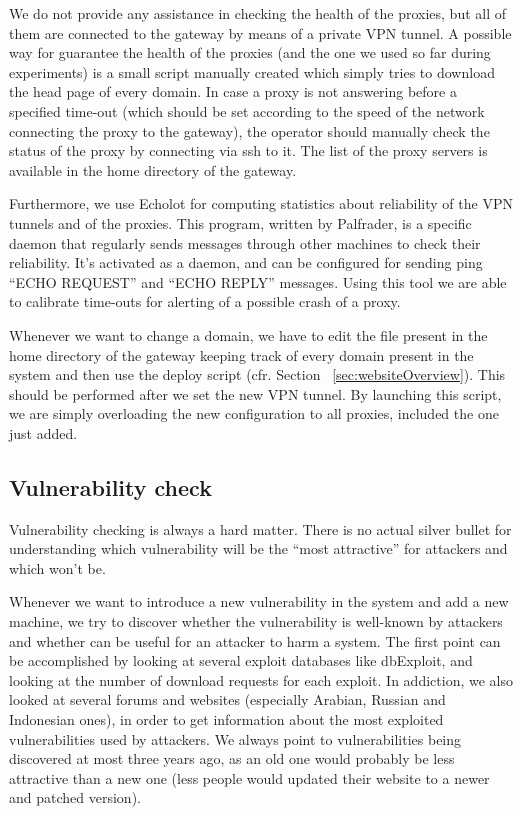 We do not provide any assistance in checking the health of the proxies, but all of them are connected to the gateway by means of a private VPN tunnel. A possible way for guarantee the health of the proxies (and the one we used so far during experiments) is a small script manually created which simply tries to download the head page of every domain. In case a proxy is not answering before a specified time-out (which should be set according to the speed of the network connecting the proxy to the gateway), the operator should manually check the status of the proxy by connecting via ssh to it. The list of the proxy servers is available in the home directory of the gateway.

Furthermore, we use Echolot \cite{echolot} for computing statistics about reliability of the VPN tunnels and of the proxies. This program, written by Palfrader, is a specific daemon that regularly sends messages through other machines to check their reliability. It's activated as a daemon, and can be configured for sending ping ``ECHO REQUEST'' and ``ECHO REPLY'' messages. Using this tool we are able to calibrate time-outs for alerting of a possible crash of a proxy.

Whenever we want to change a domain, we have to edit the file present in the home directory of the gateway keeping track of every domain present in the system and then use the deploy script (cfr. Section ~\ref{sec:websiteOverview}). This should be performed after we set the new VPN tunnel. By launching this script, we are simply overloading the new configuration to all proxies, included the one just added.

\subsection{Vulnerability check}

Vulnerability checking is always a hard matter. There is no actual silver bullet for understanding which vulnerability will be the ``most attractive'' for attackers and which won't be.

Whenever we want to introduce a new vulnerability in the system and add a new machine, we try to discover whether the vulnerability is well-known by attackers and whether can be useful for an attacker to harm a system.
The first point can be accomplished by looking at several exploit databases like dbExploit, and looking at the number of download requests for each exploit. In addiction, we also looked at several forums and websites (especially Arabian, Russian and Indonesian ones), in order to get information about the most exploited vulnerabilities used by attackers. We always point to vulnerabilities being discovered at most three years ago, as an old one would probably be less attractive than a new one (less people would updated their website to a newer and patched version).

